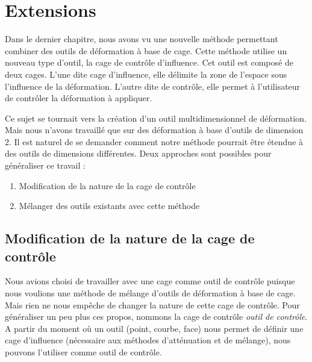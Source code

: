 

\chapter{Extensions}

\graphicspath{ {Chapter4/Chapter4Figs/PNG/}
  {Chapter4/Chapter4Figs/PDF/} {Chapter4/Chapter4Figs/} }

Dans le dernier chapitre, nous avons vu une nouvelle méthode permettant
combiner des outils de déformation à base de cage. Cette méthode utilise un
nouveau type d'outil, la cage de contrôle d'influence. Cet outil est composé
de deux cages. L'une dite cage d'influence, elle délimite la zone de l'espace
sous l'influence de la déformation. L'autre dite de contrôle, elle permet à
l'utilisateur de contrôler la déformation à appliquer.

Ce sujet se tournait vers la création d'un outil multidimensionnel de
déformation. Mais nous n'avons travaillé que sur des déformation à base
d'outils de dimension 2. Il est naturel de se demander comment notre méthode
pourrait être étendue à des outils de dimensions différentes. Deux approches
sont possibles pour généraliser ce travail :

\begin{enumerate}
\item Modification de la nature de la cage de contrôle
\item Mélanger des outils existants avec cette méthode
\end{enumerate}

\section{Modification de la nature de la cage de contrôle}

Nous avions choisi de travailler avec une cage comme outil de contrôle puisque
nous voulions une méthode de mélange d'outils de déformation à base de cage.
Mais rien ne nous empêche de changer la nature de cette cage de contrôle. Pour
généraliser un peu plus ces propos, nommons la cage de contrôle \textit{outil
de contrôle}. A partir du moment où un outil (point, courbe, face) nous permet
de définir une cage d'influence (nécessaire aux méthodes d'atténuation et de
mélange), nous pouvons l'utiliser comme outil de contrôle.

